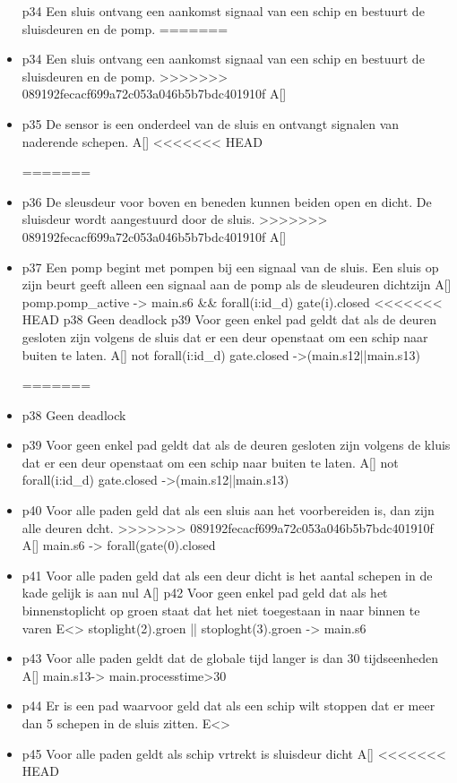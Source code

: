 \begin{itemize}
 p34 Een sluis ontvang een aankomst signaal van een schip en bestuurt de sluisdeuren en de pomp. 
=======
\item  p34 Een sluis ontvang een aankomst signaal van een schip en bestuurt de sluisdeuren en de pomp. 
>>>>>>> 089192fecacf699a72c053a046b5b7bdc401910f
  A[]
\item  p35 De sensor is een onderdeel van de sluis en ontvangt signalen van naderende schepen. 
  A[]
<<<<<<< HEAD

=======
\item  p36 De sleusdeur voor boven en beneden kunnen beiden open en dicht. De sluisdeur wordt aangestuurd door de sluis. 
>>>>>>> 089192fecacf699a72c053a046b5b7bdc401910f
  A[]
\item  p37 Een pomp begint met pompen bij een signaal van de sluis. Een sluis op zijn beurt geeft alleen een signaal aan de pomp als de sleudeuren dichtzijn
  A[] pomp.pomp_active -> main.s6 && forall(i:id_d) gate(i).closed
<<<<<<< HEAD
 p38 Geen deadlock
 p39 Voor geen enkel pad geldt dat als  de deuren gesloten zijn volgens de sluis dat er een deur openstaat om een schip naar buiten te laten.
 A[] not forall(i:id_d) gate.closed ->(main.s12||main.s13)

=======
\item  p38 Geen deadlock
\item  p39 Voor geen enkel pad geldt dat als  de deuren gesloten zijn volgens de kluis dat er een deur openstaat om een schip naar buiten te laten.
 A[] not forall(i:id_d) gate.closed ->(main.s12||main.s13)
\item  p40 Voor alle paden geld dat als een sluis aan het voorbereiden is, dan zijn alle deuren dcht.
>>>>>>> 089192fecacf699a72c053a046b5b7bdc401910f
 A[] main.s6 -> forall(gate(0).closed
\item   p41 Voor alle paden geld dat als een deur dicht is het aantal schepen in de kade gelijk is aan nul	
 A[]
 p42 Voor geen enkel pad geld dat als het binnenstoplicht op groen staat dat het niet toegestaan in naar binnen te varen
 E<> stoplight(2).groen || stoploght(3).groen -> main.s6
\item  p43 Voor alle paden geldt dat de globale tijd langer is dan 30 tijdseenheden
 A[] main.s13-> main.processtime>30
\item  p44 Er is een pad waarvoor geld dat als een schip wilt stoppen dat er meer dan 5 schepen in de sluis zitten.
 E<>
 \item p45 Voor alle paden geldt als schip vrtrekt is sluisdeur dicht
 A[] 
<<<<<<< HEAD
 

\end{itemize}
